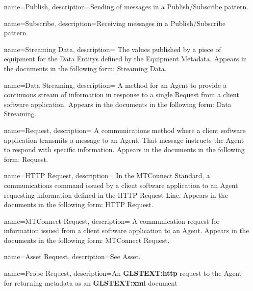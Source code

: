 {
    name={Publish},
	description={Sending of messages in a \gls{Publish/Subscribe} pattern.}
}

{
    name={Subscribe},
	description={Receiving messages in a \gls{Publish/Subscribe} pattern.}
}

{
    name={Streaming Data},
	description={
	The values published by a piece of equipment for the \glspl{Data Entity} defined by the \gls{Equipment Metadata}.
	Appears in the documents in the following form: \gls{Streaming Data}.
}
}

{
    name={Data Streaming},
	description={
	A method for an \gls{Agent} to provide a continuous stream of information in response to a single \gls{Request} from a client software application.
	Appears in the documents in the following form: \gls{Data Streaming}.
}
}

{
    name={Request},
	description={
	A communications method where a client software application transmits a message to an \gls{Agent}.  That message instructs the \gls{Agent} to respond with specific information.
	Appears in the documents in the following form: \gls{Request}.
}
}

{
    name={HTTP Request},
	description={
	In the MTConnect Standard, a communications command issued by a client software application to an \gls{Agent} requesting information defined in the \gls{HTTP Request Line}.
	Appears in the documents in the following form: \gls{HTTP Request}.
}
}

{
    name={MTConnect Request},
	description={
	A communication request for information issued from a client software application to an \gls{Agent}.
	Appears in the documents in the following form: \gls{MTConnect Request}.
}
}

{
    name={Asset Request},
	description={See \gls{Asset}.}
}

{
    name={Probe Request},
	description={An \textbf{GLSTEXT:http} request to the \gls{Agent} for returning metadata as an  \textbf{GLSTEXT:xml} document}
}

